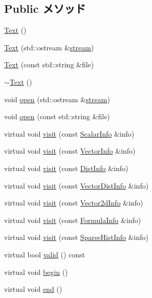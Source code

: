 \subsection*{Public メソッド}
\begin{DoxyCompactItemize}
\item 
\hyperlink{classStats_1_1Text_a950a98ae75562dc9c6a458acbd330143}{Text} ()
\item 
\hyperlink{classStats_1_1Text_a3ce64812d1237075ee99948c7c058118}{Text} (std::ostream \&\hyperlink{classStats_1_1Text_adc3bdd1632f41d809c78a20c0733715c}{stream})
\item 
\hyperlink{classStats_1_1Text_a058d85cf42499e3db5f5baad5d7f644a}{Text} (const std::string \&file)
\item 
\hyperlink{classStats_1_1Text_a8bbff8b26bfd195b340d303ffa9b121b}{$\sim$Text} ()
\item 
void \hyperlink{classStats_1_1Text_a4690db80dedba85cd71ca3fb7b350bbf}{open} (std::ostream \&\hyperlink{classStats_1_1Text_adc3bdd1632f41d809c78a20c0733715c}{stream})
\item 
void \hyperlink{classStats_1_1Text_a5bceca6a8311701ed3d1fa7794df8fd0}{open} (const std::string \&file)
\item 
virtual void \hyperlink{classStats_1_1Text_ac9ee55cac7bc664352aeaffda82dc689}{visit} (const \hyperlink{classStats_1_1ScalarInfo}{ScalarInfo} \&info)
\item 
virtual void \hyperlink{classStats_1_1Text_a1cc217540e3402a1d09b3b8c040abdb3}{visit} (const \hyperlink{classStats_1_1VectorInfo}{VectorInfo} \&info)
\item 
virtual void \hyperlink{classStats_1_1Text_a1d1b48c85e0f4ddab4cb23e57b855214}{visit} (const \hyperlink{classStats_1_1DistInfo}{DistInfo} \&info)
\item 
virtual void \hyperlink{classStats_1_1Text_a1d1e4614088a11f07d9ca033802d4d77}{visit} (const \hyperlink{classStats_1_1VectorDistInfo}{VectorDistInfo} \&info)
\item 
virtual void \hyperlink{classStats_1_1Text_a2aae6a3b530f999b3d2bdd1882643e72}{visit} (const \hyperlink{classStats_1_1Vector2dInfo}{Vector2dInfo} \&info)
\item 
virtual void \hyperlink{classStats_1_1Text_ad5ec5d0ac0a339061e845a2cb0232164}{visit} (const \hyperlink{classStats_1_1FormulaInfo}{FormulaInfo} \&info)
\item 
virtual void \hyperlink{classStats_1_1Text_a589b1491b14568a2285a6ee57465a639}{visit} (const \hyperlink{classStats_1_1SparseHistInfo}{SparseHistInfo} \&info)
\item 
virtual bool \hyperlink{classStats_1_1Text_a8d985300b138b6c5556ab17ed4df3b38}{valid} () const 
\item 
virtual void \hyperlink{classStats_1_1Text_ab0bdf5cca484fb2ba637c39384b27fb2}{begin} ()
\item 
virtual void \hyperlink{classStats_1_1Text_aaf81d3fdaf258088d7692fa70cece087}{end} ()
\end{DoxyCompactItemize}
